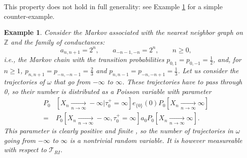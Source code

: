\documentclass[12pt,a4paper]{article}
\newtheorem{example}[theo]{Example}
\newcommand{\1}[1]{{\mathbf 1}{\{#1\}}}
\newcommand{\Z}{{\mathbb Z}}
\newcommand{\8}{{\infty}}
\begin{document}
\medskip 

This property does not hold in full generality: see Example \ref{ex:simple_not_01} for a simple counter-example. 


\begin{example}\label{ex:simple_not_01}%
Consider the Markov associated with the nearest neighbor graph on $\Z$ and the family of conductances:
\begin{equation}
  a_{n, n+1}=2^n, \qquad a_{-n-1, -n}=2^n, \qquad  n\ge 0, 
\end{equation}
i.e., the Markov chain with the transition probabilities $p_{0, 1}=p_{0, -1}=\frac{1}{2}$, and, for $n\ge 1$, $p_{n, n+1}=p_{-n, -n-1}=\frac{2}{3}$ and $p_{n, n-1}=p_{-n, -n+1}=\frac{1}{3}$.
Let us consider the trajectories of $\omega$ that go from $-\infty$ to $\infty$. These trajectories have to pass through 0, so their number is distributed as a Poisson variable with parameter 
\begin{equation}
  \begin{aligned}
  P_0& [X_n \underset{n\to\infty}\longrightarrow -\infty |\tau_0^+=\infty ] e_{\{0\}}(0) P_0[X_n \underset{n\to\infty}\longrightarrow \infty]\\
  = & P_0[X_n \underset{n\to\infty}\longrightarrow -\infty, \tau_0^+=\infty ] a_0 P_0[X_n \underset{n\to\infty}\longrightarrow \infty ].
  \end{aligned}
\end{equation}
This parameter is clearly positive and finite%
, so the number of trajectories in $\omega$ going from $-\infty$ to $\infty$ is a nontrivial random variable. It is however measureable with respect to $\mathcal{T}_{RI}$. 
\end{example}%
\end{document}
